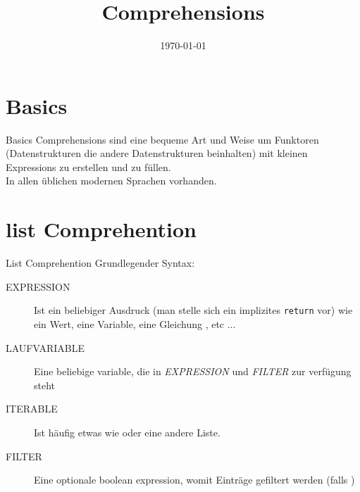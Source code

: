 


\newcommand{\topic}{
	Comprehensions
}

\title{\topic}
\supertitle{\course}
\date{\today}



\maketitle

\begin{frame}
	\tableofcontents
\end{frame}



\section{Basics}
\begin{frame}{Basics}
  Comprehensions sind eine bequeme Art und Weise um Funktoren (Datenstrukturen die andere Datenstrukturen beinhalten) mit kleinen Expressions zu erstellen und zu füllen.\\
  In allen üblichen modernen Sprachen vorhanden.
\end{frame}

\section{list Comprehention}
\begin{frame}{List Comprehention}
  Grundlegender Syntax: \\
  \begin{description}
    \item[EXPRESSION] Ist ein beliebiger Ausdruck (man stelle sich ein implizites \texttt{return} vor) wie ein Wert, eine Variable, eine Gleichung , etc ...
    \item[LAUFVARIABLE] Eine beliebige variable, die in \textit{EXPRESSION} und \textit{FILTER} zur verfügung steht
    \item[ITERABLE] Ist häufig etwas wie  oder eine andere Liste.
    \item[FILTER] Eine optionale boolean expression, womit Einträge gefiltert werden (falls )
  \end{description}


\end{frame}

